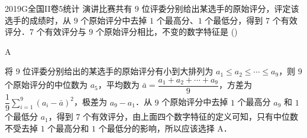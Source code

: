 
\begin{problem}{2019}{G}{全国II卷}{5}{统计}
演讲比赛共有 $9$ 位评委分别给出某选手的原始评分，评定该选手的成绩时，从 $9$ 个原始评分中去掉 $1$ 个最高分、$1$ 个最低分，得到 $7$ 个有效评分．$7$ 个有效评分与 $9$ 个原始评分相比，不变的数字特征是 (\hspace{1cm})
\begin{choices}
\end{choices}
\end{problem}

\begin{answer}
A
\end{answer}

\begin{solutions}
将 $9$ 位评委分别给出的某选手的原始评分有小到大排列为 $a_1\leqslant a_2\leqslant\cdots\leqslant a_9$，则 $9$ 个原始评分的中位数为 $a_5$，平均数为 $\bar{a}=\dfrac{a_1+a_2+\cdots+a_9}{9}$，方差为 $\dfrac{1}{9}\displaystyle\sum_{i=1}^{9}(a_i-\bar{a})^2$，极差为 $a_9-a_1$．从 $9$ 个原始评分中去掉 $1$ 个最高分 $a_9$ 和 $1$ 个最低分 $a_1$，得到 $7$ 个有效评分，由上面四个数字特征的定义可知，只有中位数不受去掉 $1$ 个最高分和 $1$ 个最低分的影响，所以应该选择 A．
\end{solutions}